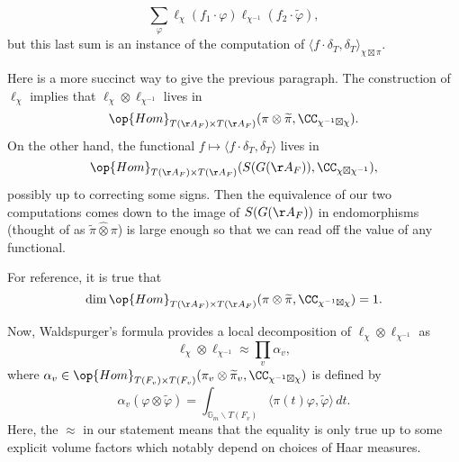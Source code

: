 \documentclass[../notes.tex]{subfiles}
\begin{document}
\[\sum_\varphi\ell_\chi(f_1\cdot\varphi)\ell_{\chi^{-1}}(f_2\cdot\widetilde\varphi),\]
but this last sum is an instance of the computation of $\langle f\cdot\delta_T,\delta_T\rangle_{\chi\boxtimes\pi}$.
\begin{remark}
	Here is a more succinct way to give the previous paragraph. The construction of $\ell_\chi$ implies that $\ell_\chi\otimes\ell_{\chi^{-1}}$ lives in
	\[\op{Hom}_{T(\AA_F)\times T(\AA_F)}(\pi\otimes\widetilde\pi,\CC_{\chi^{-1}\boxtimes\chi}).\]
	On the other hand, the functional $f\mapsto\langle f\cdot\delta_T,\delta_T\rangle$ lives in
	\[\op{Hom}_{T(\AA_F)\times T(\AA_F)}(S(G(\AA_F)),\CC_{\chi\boxtimes\chi^{-1}}),\]
	possibly up to correcting some signs. Then the equivalence of our two computations comes down to the image of $S(G(\AA_F))$ in endomorphisms (thought of as $\widetilde\pi\widehat\otimes\pi$) is large enough so that we can read off the value of any functional.
\end{remark}
\begin{remark}
	For reference, it is true that
	\[\dim\op{Hom}_{T(\AA_F)\times T(\AA_F)}(\pi\otimes\widetilde\pi,\CC_{\chi^{-1}\boxtimes\chi})=1.\]
\end{remark}
Now, Waldspurger's formula provides a local decomposition of $\ell_\chi\otimes\ell_{\chi^{-1}}$ as
\[\ell_\chi\otimes\ell_{\chi^{-1}}\approx\prod_v\alpha_v,\]
where $\alpha_v\in\op{Hom}_{T(F_v)\times T(F_v)}(\pi_v\otimes\widetilde\pi_v,\CC_{\chi^{-1}\boxtimes\chi})$ is defined by
\[\alpha_v(\varphi\otimes\widetilde\varphi)=\int_{\mathbb G_m\backslash T(F_v)}\langle\pi(t)\varphi,\widetilde\varphi\rangle\,dt.\]
Here, the $\approx$ in our statement means that the equality is only true up to some explicit volume factors which notably depend on choices of Haar measures.
\end{document}
